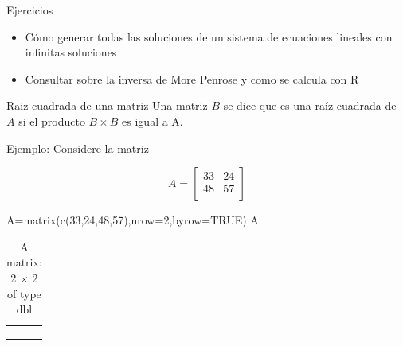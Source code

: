 \documentclass[
  ignorenonframetext,
  aspectratio=169,
  spanish,
]{beamer}
\newenvironment{Shaded}{\begin{snugshade}}{\end{snugshade}}
\newcommand{\AttributeTok}[1]{\textcolor[rgb]{0.40,0.45,0.13}{#1}}
\newcommand{\ConstantTok}[1]{\textcolor[rgb]{0.56,0.35,0.01}{#1}}
\newcommand{\DecValTok}[1]{\textcolor[rgb]{0.68,0.00,0.00}{#1}}
\newcommand{\FunctionTok}[1]{\textcolor[rgb]{0.28,0.35,0.67}{#1}}
\newcommand{\NormalTok}[1]{\textcolor[rgb]{0.00,0.23,0.31}{#1}}
\newcommand{\OtherTok}[1]{\textcolor[rgb]{0.00,0.23,0.31}{#1}}
\providecommand{\tightlist}{%
  \setlength{\itemsep}{0pt}\setlength{\parskip}{0pt}}
\begin{document}
\begin{frame}{Ejercicios}
\label{ejercicios}
\begin{itemize}
\tightlist
\item
  Cómo generar todas las soluciones de un sistema de ecuaciones lineales
  con infinitas soluciones
\item
  Consultar sobre la inversa de More Penrose y como se calcula con R
\end{itemize}
\end{frame}

\begin{frame}[fragile]{Raiz cuadrada de una matriz}
\label{raiz-cuadrada-de-una-matriz}
Una matriz \(B\) se dice que es una raíz cuadrada de \(A\) si el
producto \(B\times B\) es igual a A.

Ejemplo: Considere la matriz

\[A=\begin{bmatrix}
33 & 24 \\ 
48 & 57 \\
\end{bmatrix}\]

\begin{Shaded}
\begin{Highlighting}[]
\NormalTok{A}\OtherTok{=}\FunctionTok{matrix}\NormalTok{(}\FunctionTok{c}\NormalTok{(}\DecValTok{33}\NormalTok{,}\DecValTok{24}\NormalTok{,}\DecValTok{48}\NormalTok{,}\DecValTok{57}\NormalTok{),}\AttributeTok{nrow=}\DecValTok{2}\NormalTok{,}\AttributeTok{byrow=}\ConstantTok{TRUE}\NormalTok{)}
\NormalTok{A}
\end{Highlighting}
\end{Shaded}

\begin{longtable}[]{@{}
  >{\raggedright\arraybackslash}p{}
  >{\raggedright\arraybackslash}p{}@{}}
\caption{A matrix: 2 × 2 of type dbl}\tabularnewline
\toprule\noalign{}
\endfirsthead
\endhead
33 & 24 \\
48 & 57 \\
\bottomrule\noalign{}
\end{longtable}
\end{frame}
\end{document}
